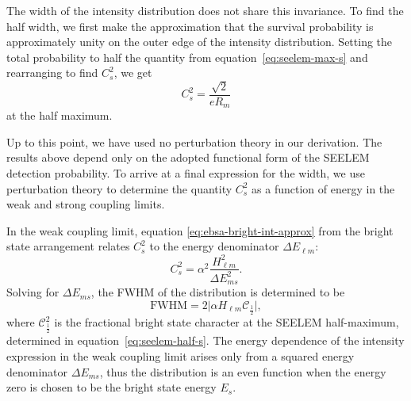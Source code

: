 \documentclass[12pt]{mitthesis}
\begin{document}
The width of the intensity distribution does not share this
invariance.  To find the half width, we first make the approximation
that the survival probability is approximately unity on the outer edge
of the intensity distribution. Setting the total probability to half
the quantity from equation~\ref{eq:seelem-max-s} and rearranging to
find $C_s^2$, we get
\begin{equation}
  \label{eq:seelem-half-s}
  C_s^2 = \frac{\sqrt{2}}{e R_m} 
\end{equation}
at the half maximum.

Up to this point, we have used no perturbation theory in our
derivation. The results above depend only on the adopted functional
form of the SEELEM detection probability.  To arrive at a final
expression for the width, we use perturbation theory to determine the
quantity $C_s^2$ as a function of energy in the weak and strong
coupling limits.

In the weak coupling limit, equation \ref{eq:ebsa-bright-int-approx}
from the bright state arrangement relates $C_s^2$ to the energy
denominator $\Delta E_{\ell m}$:
\begin{equation}
  C_s^2 = \alpha^2 \frac{H_{\ell m}^2}{\Delta E_{ms}^2}.
\end{equation}
Solving for $\Delta E_{ms}$, the FWHM of the distribution
is determined to be
\begin{equation}
  \label{eq:seelem-weak-fwhm}
  \text{FWHM} = 2 \lvert \alpha H_{\ell m} \mathcal{C}_{\frac{1}{2}}\rvert,
\end{equation}
where $\mathcal{C}_{\frac{1}{2}}^2$ is the fractional bright state
character at the SEELEM half-maximum, determined in
equation~\ref{eq:seelem-half-s}.  The energy dependence of the
intensity expression in the weak coupling limit arises only from a
squared energy denominator $\Delta E_{ms}$, thus the distribution is
an even function when the energy zero is chosen to be the bright state
energy $E_s$.
\end{document}

